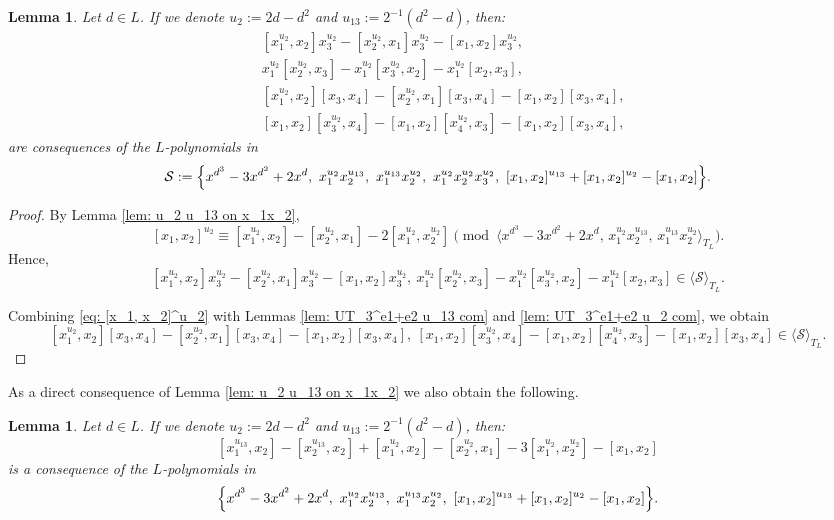 \documentclass[a4paper,reqno]{amsart}
\newtheorem{lemma}[theorem]{Lemma}
\theoremstyle{definition}
\numberwithin{equation}{section}
\numberwithin{theorem}{section}
\begin{document}
\begin{lemma}\label{lem: UT_3^e1+e2 u_2 ordering}
    Let $d\in L$. If we denote $u_{2}:=2d -d^2$ and $u_{13}:=2^{-1}(d^2 - d)$, then:
    \begin{align*}
        &[x_1^{u_{2}}, x_2]x_3^{u_{2}}- [x_2^{u_{2}}, x_1]x_3^{u_{2}} - [x_1, x_2]x_3^{u_{2}},\\
        &x_1^{u_{2}}[x_2^{u_{2}}, x_3]- x_1^{u_{2}}[x_3^{u_{2}}, x_2] - x_1^{u_{2}}[x_2, x_3],\\
        & [x_1^{u_{2}}, x_2][x_3, x_4]- [x_2^{u_{2}}, x_1][x_3, x_4]- [x_1, x_2][x_3, x_4], \\
        & [x_1, x_2][x_3^{u_{2}}, x_4]- [x_1, x_2][x_4^{u_{2}}, x_3]- [x_1, x_2][x_3, x_4],
    \end{align*}
     are consequences of the $L$-polynomials in
     $$
     \mathcal{S}:= \Bigl\{ x^{d^3}-3x^{d^2}+2x^{d},\ x_1^{u_{2}}x_2^{u_{13}}, \ x_1^{u_{13}}x_2^{u_{2}}, \ x_1^{u_{2}} x_2^{u_{2}}x_3^{u_{2}}, \  [x_1,x_2]^{u_{13}}+ [x_1,x_2]^{u_{2}} - [x_1,x_2]\Bigr\}.
     $$
\end{lemma}
\begin{proof}
By Lemma \ref{lem: u_2 u_13 on x_1x_2},
\begin{equation}\label{eq: [x_1, x_2]^u_2}
    [x_1, x_2]^{u_{2}}\equiv [x_1^{u_{2}}, x_2]  - [x_2^{u_{2}}, x_1] -2 [x_1^{u_{2}}, x_2^{u_{2}}] 
\pmod{\langle x^{d^3}-3x^{d^2}+2x^{d},\, x_1^{u_{2}}x_2^{u_{13}}, \, x_1^{u_{13}}x_2^{u_{2}} \rangle_{T_L}}.
\end{equation}
Hence,  
$$
[x_1^{u_{2}}, x_2] x_3^{u_{2}} - [x_2^{u_{2}}, x_1] x_3^{u_{2}}- [x_1,x_2]  x_3^{u_{2}}, \ x_1^{u_{2}}[x_2^{u_{2}}, x_3]- x_1^{u_{2}}[x_3^{u_{2}}, x_2] - x_1^{u_{2}}[x_2, x_3]\in \langle \mathcal{S}\rangle_{T_L}.
$$

Combining \eqref{eq: [x_1, x_2]^u_2} with Lemmas \ref{lem: UT_3^e1+e2 u_13 com} and \ref{lem: UT_3^e1+e2 u_2 com}, we obtain
$$
[x_1^{u_{2}}, x_2][x_3, x_4]- [x_2^{u_{2}}, x_1][x_3, x_4]- [x_1, x_2][x_3, x_4], \ [x_1, x_2][x_3^{u_{2}}, x_4]- [x_1, x_2][x_4^{u_{2}}, x_3]- [x_1, x_2][x_3, x_4]\in \langle \mathcal{S}\rangle_{T_L}.
$$
\end{proof}


As a direct consequence of Lemma \ref{lem: u_2 u_13 on x_1x_2} we also obtain the following.
\begin{lemma}\label{lem: UT_3^e1+e2 u_13 ordering}
    Let $d\in L$. If we denote $u_{2}:=2d -d^2$ and $u_{13}:=2^{-1}(d^2 - d)$, then:
  $$
   [x_1^{u_{13}},x_2]- [x_2^{u_{13}},x_2]+ [x_1^{u_{2}},x_2] -  [x_2^{u_{2}},x_1]- 3 [x_1^{u_{2}}, x_2^{u_{2}}] - [x_1,x_2]
  $$
    is a consequence of the $L$-polynomials in
     $$
     \Bigl\{ x^{d^3}-3x^{d^2}+2x^{d},\ x_1^{u_{2}}x_2^{u_{13}}, \ x_1^{u_{13}}x_2^{u_{2}}, \ [x_1,x_2]^{u_{13}}+ [x_1,x_2]^{u_{2}} - [x_1,x_2]\Bigr\}.
     $$
\end{lemma}
\end{document}

